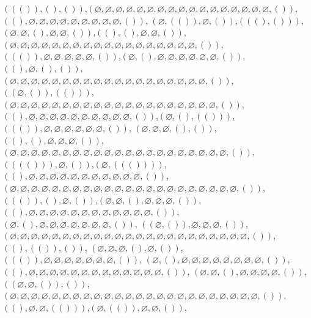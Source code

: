 \documentclass[12pt]{article}
\def\qua{()}
\newcommand{\quat}[1]{\left( #1 \right)}
\def\nul{\varnothing}
\begin{document}
$\quat{\quat{\qua},\qua,\qua}$,$\quat{\nul,\nul,\nul,\nul,\nul,\nul,\nul,\nul,\nul,\nul,\nul,\nul,\nul,\nul,\nul,\nul,\nul,\qua}$,$\quat{\qua,\nul,\nul,\nul,\nul,\nul,\nul,\nul,\nul,\nul,\qua}$,
$\quat{\nul,\quat{\qua},\nul,\qua}$,$\quat{\quat{\qua,\qua}}$,$\quat{\nul,\nul,\qua,\nul,\nul,\qua}$,$\quat{\qua,\qua,\nul,\nul,\qua}$,
$\quat{\nul,\nul,\nul,\nul,\nul,\nul,\nul,\nul,\nul,\nul,\nul,\nul,\nul,\nul,\nul,\nul,\nul,\nul,\qua}$,$\quat{\quat{\qua},\nul,\nul,\nul,\nul,\nul,\qua}$,$\quat{\nul,\qua,\nul,\nul,\nul,\nul,\nul,\nul,\qua}$,
$\quat{\qua,\nul,\qua,\qua}$,$\quat{\nul,\nul,\nul,\nul,\nul,\nul,\nul,\nul,\nul,\nul,\nul,\nul,\nul,\nul,\nul,\nul,\nul,\nul,\nul,\qua}$,
$\quat{\quat{\nul,\qua},\quat{\qua}}$,$\quat{\nul,\nul,\nul,\nul,\nul,\nul,\nul,\nul,\nul,\nul,\nul,\nul,\nul,\nul,\nul,\nul,\nul,\nul,\nul,\nul,\qua}$,
$\quat{\qua,\nul,\nul,\nul,\nul,\nul,\nul,\nul,\nul,\nul,\nul,\qua}$,$\quat{\nul,\qua,\quat{\qua}}$,$\quat{\quat{\qua},\nul,\nul,\nul,\nul,\nul,\nul,\qua}$,
$\quat{\nul,\nul,\nul,\qua,\qua}$,$\quat{\qua,\qua,\nul,\nul,\nul,\qua}$,$\quat{\nul,\nul,\nul,\nul,\nul,\nul,\nul,\nul,\nul,\nul,\nul,\nul,\nul,\nul,\nul,\nul,\nul,\nul,\nul,\nul,\nul,\qua}$,
$\quat{\quat{\quat{\qua}},\nul,\qua}$,$\quat{\nul,\quat{\quat{\qua}}}$,
$\quat{\qua,\nul,\nul,\nul,\nul,\nul,\nul,\nul,\nul,\nul,\nul,\nul,\qua}$,$\quat{\nul,\nul,\nul,\nul,\nul,\nul,\nul,\nul,\nul,\nul,\nul,\nul,\nul,\nul,\nul,\nul,\nul,\nul,\nul,\nul,\nul,\nul,\qua}$,
$\quat{\quat{\qua},\qua,\nul,\qua}$,$\quat{\nul,\nul,\qua,\nul,\nul,\nul,\qua}$,$\quat{\qua,\nul,\nul,\nul,\nul,\nul,\nul,\nul,\nul,\nul,\nul,\nul,\nul,\qua}$,$\quat{\nul,\qua,\nul,\nul,\nul,\nul,\nul,\nul,\nul,\qua}$,
$\quat{\quat{\nul,\qua},\nul,\nul,\nul,\qua}$,$\quat{\nul,\nul,\nul,\nul,\nul,\nul,\nul,\nul,\nul,\nul,\nul,\nul,\nul,\nul,\nul,\nul,\nul,\nul,\nul,\nul,\nul,\nul,\nul,\qua}$,$\quat{\qua,\quat{\qua},\qua}$,
$\quat{\nul,\nul,\nul,\qua,\nul,\qua}$,$\quat{\quat{\qua},\nul,\nul,\nul,\nul,\nul,\nul,\nul,\qua}$,
$\quat{\nul,\qua,\nul,\nul,\nul,\nul,\nul,\nul,\nul,\nul,\qua}$,$\quat{\qua,\nul,\nul,\nul,\nul,\nul,\nul,\nul,\nul,\nul,\nul,\nul,\nul,\nul,\qua}$,
$\quat{\nul,\nul,\qua,\nul,\nul,\nul,\nul,\qua}$,$\quat{\quat{\nul,\nul,\qua},\qua}$,$\quat{\nul,\nul,\nul,\nul,\nul,\nul,\nul,\nul,\nul,\nul,\nul,\nul,\nul,\nul,\nul,\nul,\nul,\nul,\nul,\nul,\nul,\nul,\nul,\nul,\qua}$,
$\quat{\qua,\nul,\nul,\quat{\qua}}$,$\quat{\nul,\quat{\qua},\nul,\nul,\qua}$,
\end{document}
